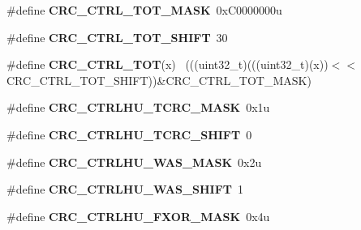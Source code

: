 \begin{DoxyCompactItemize}
\item 
\hypertarget{group___c_r_c___register___masks_ga66da08ca8e22cd72c74e4b3cf53df7dd}{}\#define {\bfseries C\+R\+C\+\_\+\+C\+T\+R\+L\+\_\+\+T\+O\+T\+\_\+\+M\+A\+S\+K}~0x\+C0000000u\label{group___c_r_c___register___masks_ga66da08ca8e22cd72c74e4b3cf53df7dd}

\item 
\hypertarget{group___c_r_c___register___masks_gaad1005ea5864ca6795a27b3f7db38ea6}{}\#define {\bfseries C\+R\+C\+\_\+\+C\+T\+R\+L\+\_\+\+T\+O\+T\+\_\+\+S\+H\+I\+F\+T}~30\label{group___c_r_c___register___masks_gaad1005ea5864ca6795a27b3f7db38ea6}

\item 
\hypertarget{group___c_r_c___register___masks_ga13375c3e505a73a0b114542b7476dbff}{}\#define {\bfseries C\+R\+C\+\_\+\+C\+T\+R\+L\+\_\+\+T\+O\+T}(x)                                                ~(((uint32\+\_\+t)(((uint32\+\_\+t)(x))$<$$<$C\+R\+C\+\_\+\+C\+T\+R\+L\+\_\+\+T\+O\+T\+\_\+\+S\+H\+I\+F\+T))\&C\+R\+C\+\_\+\+C\+T\+R\+L\+\_\+\+T\+O\+T\+\_\+\+M\+A\+S\+K)\label{group___c_r_c___register___masks_ga13375c3e505a73a0b114542b7476dbff}

\item 
\hypertarget{group___c_r_c___register___masks_ga1d62eb284fb7d178fddaf03e10dcd19c}{}\#define {\bfseries C\+R\+C\+\_\+\+C\+T\+R\+L\+H\+U\+\_\+\+T\+C\+R\+C\+\_\+\+M\+A\+S\+K}~0x1u\label{group___c_r_c___register___masks_ga1d62eb284fb7d178fddaf03e10dcd19c}

\item 
\hypertarget{group___c_r_c___register___masks_ga9299763dd32745d443ab84a9911ad775}{}\#define {\bfseries C\+R\+C\+\_\+\+C\+T\+R\+L\+H\+U\+\_\+\+T\+C\+R\+C\+\_\+\+S\+H\+I\+F\+T}~0\label{group___c_r_c___register___masks_ga9299763dd32745d443ab84a9911ad775}

\item 
\hypertarget{group___c_r_c___register___masks_ga9c716f81782ec7e214f823ef98fa8eb3}{}\#define {\bfseries C\+R\+C\+\_\+\+C\+T\+R\+L\+H\+U\+\_\+\+W\+A\+S\+\_\+\+M\+A\+S\+K}~0x2u\label{group___c_r_c___register___masks_ga9c716f81782ec7e214f823ef98fa8eb3}

\item 
\hypertarget{group___c_r_c___register___masks_gacd050b23263379193cf9cde3e1567ab1}{}\#define {\bfseries C\+R\+C\+\_\+\+C\+T\+R\+L\+H\+U\+\_\+\+W\+A\+S\+\_\+\+S\+H\+I\+F\+T}~1\label{group___c_r_c___register___masks_gacd050b23263379193cf9cde3e1567ab1}

\item 
\hypertarget{group___c_r_c___register___masks_ga0a552f60712b28cd96e939d4324157df}{}\#define {\bfseries C\+R\+C\+\_\+\+C\+T\+R\+L\+H\+U\+\_\+\+F\+X\+O\+R\+\_\+\+M\+A\+S\+K}~0x4u\label{group___c_r_c___register___masks_ga0a552f60712b28cd96e939d4324157df}


\end{DoxyCompactItemize}
